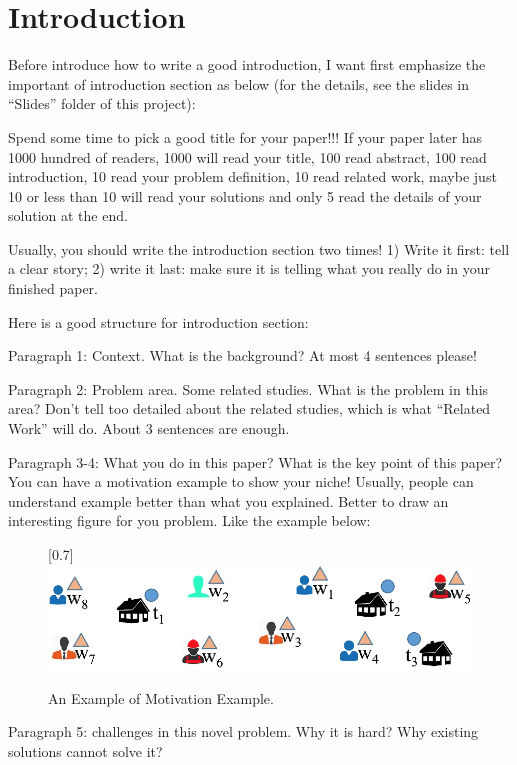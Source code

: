 \section{Introduction}

Before introduce how to write a good introduction, I want first emphasize the important of introduction section as below (for the details, see the slides in ``Slides'' folder of this project):

Spend some time to pick a good title for your paper!!! If your paper later has 1000 hundred of readers, 1000 will read your title, 100 read abstract, 100 read introduction, 10 read your problem definition, 10 read related work, maybe just 10 or less than 10 will read your solutions and only 5 read the details of your solution at the end.


Usually, you should write the introduction section two times! 1) Write it first: tell a clear story; 2) write it last: make sure it is telling what you really do in your finished paper.

Here is a good structure for introduction section:

Paragraph 1: Context. What is the background? At most 4 sentences please!

Paragraph 2: Problem area. Some related studies. What is the problem in this area? Don't tell too detailed about the related studies, which is what ``Related Work'' will do.  About 3 sentences are enough.

Paragraph 3-4: What you do in this paper? What is the key point of this paper? You can have a motivation example to show your niche! Usually, people can understand example better than what you explained. Better to draw an interesting figure for you problem. Like the example \cite{cheng2016task} below:

\begin{figure}[h!]\centering
	\scalebox{0.7}[0.7]{\includegraphics{../figures/motivation_example.eps}}\vspace{-1ex}
	\caption{\small An Example of Motivation Example.}
	\label{fig:bbq_example}
\end{figure}

Paragraph 5: challenges in this novel problem. Why it is hard? Why existing solutions cannot solve it?

